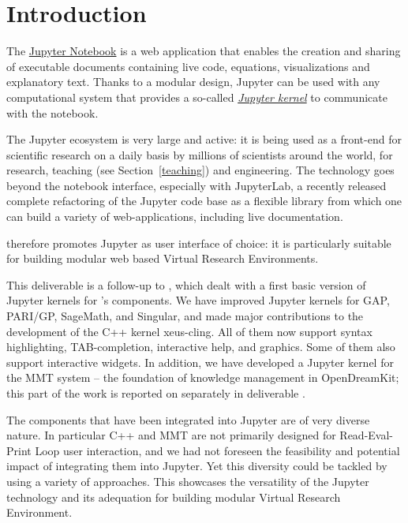 \documentclass{deliverablereport}
\author{Jeroen Demeyer, Sebastian Gutsche, Nicolas M.~Thiéry}
\begin{document}
\maketitle
\tableofcontents


\section{Introduction}

The \href{https://jupyter.org}{Jupyter Notebook} is a web application
that enables the creation and sharing of executable documents
containing live code, equations, visualizations and explanatory text.
Thanks to a modular design, Jupyter can be used with any computational
system that provides a so-called
\href{https://jupyter.readthedocs.io/en/latest/projects/kernels.html}{\emph{Jupyter kernel}}
to communicate with the notebook.

The Jupyter ecosystem is very large and active: it is being used as a
front-end for scientific research on a daily basis by millions of
scientists around the world, for research, teaching (see
Section~\ref{teaching}) and engineering. The technology goes beyond
the notebook interface, especially with JupyterLab, a recently
released complete refactoring of the Jupyter code base as a flexible
library from which one can build a variety of web-applications,
including live documentation.

\ODK therefore promotes Jupyter as user interface of choice:
it is particularly suitable for building modular web based Virtual Research Environments.

This deliverable is a follow-up to
, which dealt with a first basic
version of Jupyter kernels for \ODK's components. We have improved
Jupyter kernels for GAP, PARI/GP, SageMath, and Singular, and made
major contributions to the development of the C++ kernel xeus-cling.
All of them now support syntax highlighting, TAB-completion,
interactive help, and graphics. Some of them also support interactive
widgets.
In addition, we have developed a Jupyter kernel for the MMT system -- the
foundation of knowledge management in OpenDreamKit; this part of the
work is reported on separately in deliverable
.

The components that have been integrated into Jupyter are of very
diverse nature. In particular C++ and MMT are not primarily designed
for Read-Eval-Print Loop user interaction, and we had not foreseen the
feasibility and potential impact of integrating them into Jupyter. Yet
this diversity could be tackled by using a variety of approaches. This
showcases the versatility of the Jupyter technology and its adequation
for building modular Virtual Research Environment.
\end{document}
